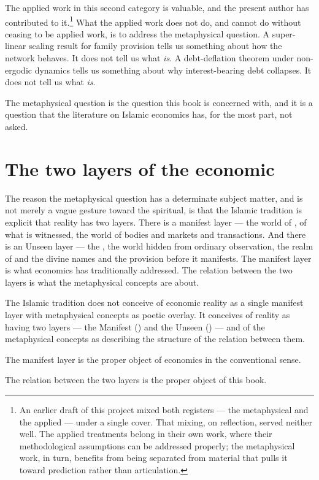 The applied work in this second category is valuable, and the present
author has contributed to it.\footnote{An earlier draft of this project
mixed both registers --- the metaphysical and the applied --- under a
single cover. That mixing, on reflection, served neither well. The
applied treatments belong in their own work, where their methodological
assumptions can be addressed properly; the metaphysical work, in turn,
benefits from being separated from material that pulls it toward
prediction rather than articulation.} What the applied work does not
do, and cannot do without ceasing to be applied work, is to address the
metaphysical question. A super-linear scaling result for family
provision tells us something about how the network behaves. It does
not tell us what  \emph{is}. A debt-deflation theorem under
non-ergodic dynamics tells us something about why interest-bearing
debt collapses. It does not tell us what  \emph{is}.

The metaphysical question is the question this book is concerned with,
and it is a question that the literature on Islamic economics has, for
the most part, not asked.

\section{The two layers of the economic}
\label{sec:two-layers}

The reason the metaphysical question has a determinate subject matter,
and is not merely a vague gesture toward the spiritual, is that the
Islamic tradition is explicit that reality has two layers. There is a
manifest layer --- the world of , of what is witnessed,
the world of bodies and markets and transactions. And there is an
Unseen layer --- the , the world hidden from ordinary
observation, the realm of  and the divine names and the
provision before it manifests. The manifest layer is what economics has
traditionally addressed. The relation between the two layers is what
the metaphysical concepts are about.

\begin{principlebox}
The Islamic tradition does not conceive of economic reality as a single
manifest layer with metaphysical concepts as poetic overlay. It
conceives of reality as having two layers --- the Manifest
() and the Unseen () --- and of the metaphysical
concepts as describing the structure of the relation between them.

The manifest layer is the proper object of economics in the conventional
sense.

The relation between the two layers is the proper object of this book.
\end{principlebox}

